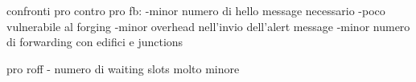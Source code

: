 


confronti pro contro
pro fb:
-minor numero di hello message necessario
-poco vulnerabile al forging
-minor overhead nell'invio dell'alert message
-minor numero di forwarding con edifici e junctions


pro roff
- numero di waiting slots molto minore


